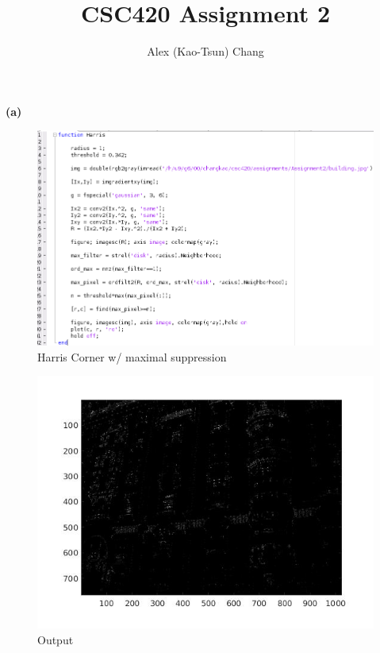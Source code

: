 \documentclass[]{article}
\title{CSC420 Assignment 2}
\author{Alex (Kao-Tsun) Chang}
\begin{document}
\maketitle


\section{}
\textbf{(a)}
\begin{figure}[h!]
\centering
\includegraphics[width=1.35\textwidth]{img/1a-code.png}
\caption{Harris Corner w/ maximal suppression}
\end{figure}
\begin{figure}[h!]
\centering
\includegraphics[width=1.15\textwidth]{img/1a.jpg}
\caption{Output}
\end{figure}
\end{document}
